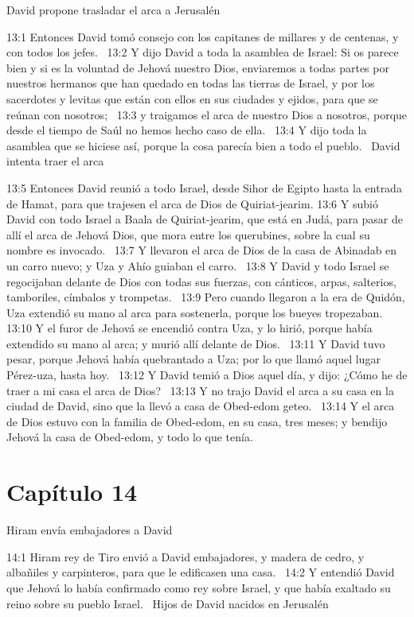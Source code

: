 David propone trasladar el arca a Jerusalén  

13:1 Entonces David tomó consejo con los capitanes de millares y de centenas, y con todos los jefes.  
13:2 Y dijo David a toda la asamblea de Israel: Si os parece bien y si es la voluntad de Jehová nuestro Dios, enviaremos a todas partes por nuestros hermanos que han quedado en todas las tierras de Israel, y por los sacerdotes y levitas que están con ellos en sus ciudades y ejidos, para que se reúnan con nosotros;  
13:3 y traigamos el arca de nuestro Dios a nosotros, porque desde el tiempo de Saúl no hemos hecho caso de ella.  
13:4 Y dijo toda la asamblea que se hiciese así, porque la cosa parecía bien a todo el pueblo.  
David intenta traer el arca  

13:5 Entonces David reunió a todo Israel, desde Sihor de Egipto hasta la entrada de Hamat, para que trajesen el arca de Dios de Quiriat-jearim. 
13:6 Y subió David con todo Israel a Baala de Quiriat-jearim, que está en Judá, para pasar de allí el arca de Jehová Dios, que mora entre los querubines, sobre la cual su nombre es invocado.  
13:7 Y llevaron el arca de Dios de la casa de Abinadab en un carro nuevo; y Uza y Ahío guiaban el carro.  
13:8 Y David y todo Israel se regocijaban delante de Dios con todas sus fuerzas, con cánticos, arpas, salterios, tamboriles, címbalos y trompetas.  
13:9 Pero cuando llegaron a la era de Quidón, Uza extendió su mano al arca para sostenerla, porque los bueyes tropezaban.  
13:10 Y el furor de Jehová se encendió contra Uza, y lo hirió, porque había extendido su mano al arca; y murió allí delante de Dios.  
13:11 Y David tuvo pesar, porque Jehová había quebrantado a Uza; por lo que llamó aquel lugar Pérez-uza, hasta hoy.  
13:12 Y David temió a Dios aquel día, y dijo: ¿Cómo he de traer a mi casa el arca de Dios?  
13:13 Y no trajo David el arca a su casa en la ciudad de David, sino que la llevó a casa de Obed-edom geteo.  
13:14 Y el arca de Dios estuvo con la familia de Obed-edom, en su casa, tres meses; y bendijo Jehová la casa de Obed-edom, y todo lo que tenía.  
\section*{Capítulo 14}
Hiram envía embajadores a David  


14:1 Hiram rey de Tiro envió a David embajadores, y madera de cedro, y albañiles y carpinteros, para que le edificasen una casa.  
14:2 Y entendió David que Jehová lo había confirmado como rey sobre Israel, y que había exaltado su reino sobre su pueblo Israel.  
Hijos de David nacidos en Jerusalén  

